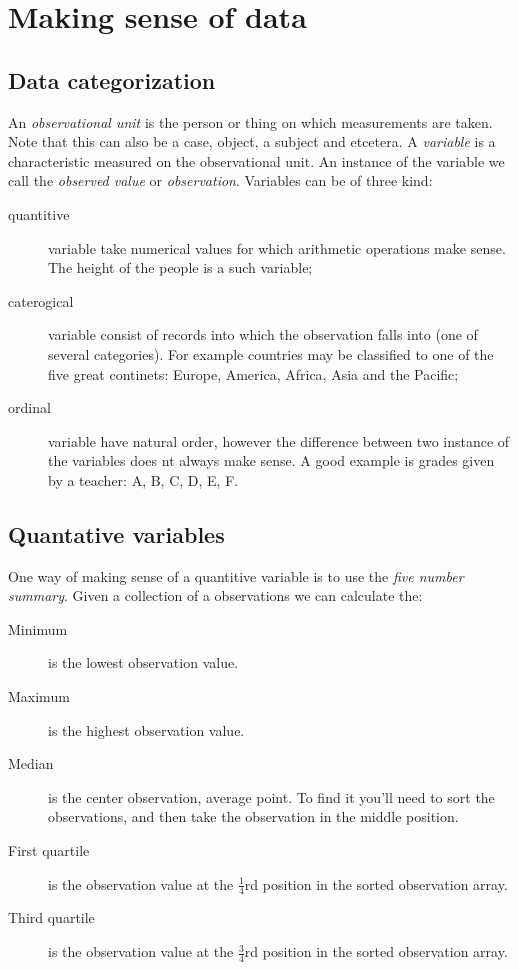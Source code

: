 \section{Making sense of data}

\subsection{Data categorization}

An \emph{observational unit} is the person or thing on which measurements are
taken. Note that this can also be a case, object, a subject and etcetera. A
\emph{variable} is a characteristic measured on the observational unit. An
instance of the variable we call the \emph{observed value} or
\emph{observation}. Variables can be of three kind:

\begin{description}
  \item[quantitive] variable take numerical values for which arithmetic
  operations make sense. The height of the people is a such variable;
  \item[caterogical] variable consist of records into which the observation
  falls into (one of several categories). For example countries may be
  classified to one of the five great continets: Europe, America, Africa, Asia
  and the Pacific;
  \item[ordinal] variable have natural order, however the difference between two
  instance of the variables does nt always make sense. A good example is grades
  given by a teacher: A, B, C, D, E, F.
   
\end{description}

\subsection{Quantative variables}

One way of making sense of a quantitive variable is to use the \emph{five
number summary}. Given a collection of a observations we can calculate the: 

\begin{description}
  \item[Minimum] is the lowest observation value.
  \item[Maximum] is the highest observation value.
  \item[Median] is the center observation, average point. To find it you'll need
  to sort the observations, and then take the observation in the middle
  position.
  \item[First quartile] is the observation value at the $\frac{1}{4}$rd position
  in the sorted observation array.
  \item[Third quartile] is the observation value at the $\frac{3}{4}$rd position
  in the sorted observation array.
\end{description}

